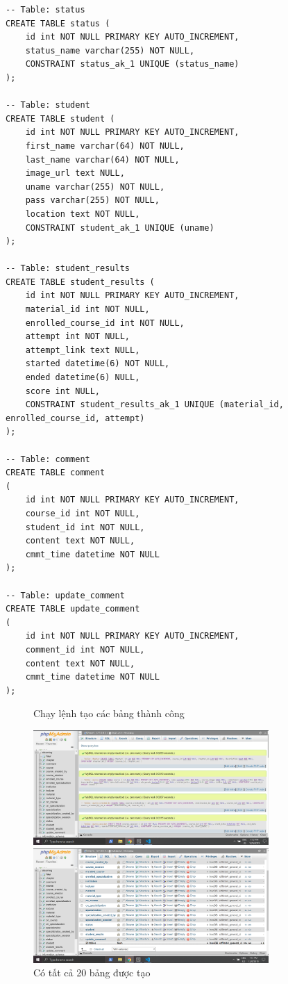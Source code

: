 \documentclass[12pt,a4paper,titlepage]{article}
\begin{document}
\begin{lstlisting}
-- Table: status
CREATE TABLE status (
    id int NOT NULL PRIMARY KEY AUTO_INCREMENT,
    status_name varchar(255) NOT NULL,
    CONSTRAINT status_ak_1 UNIQUE (status_name)
);

-- Table: student
CREATE TABLE student (
    id int NOT NULL PRIMARY KEY AUTO_INCREMENT,
    first_name varchar(64) NOT NULL,
    last_name varchar(64) NOT NULL,
    image_url text NULL,
    uname varchar(255) NOT NULL,
    pass varchar(255) NOT NULL,
    location text NOT NULL,
    CONSTRAINT student_ak_1 UNIQUE (uname)
);

-- Table: student_results
CREATE TABLE student_results (
    id int NOT NULL PRIMARY KEY AUTO_INCREMENT,
    material_id int NOT NULL,
    enrolled_course_id int NOT NULL,
    attempt int NOT NULL,
    attempt_link text NULL,
    started datetime(6) NOT NULL,
    ended datetime(6) NULL,
    score int NULL,
    CONSTRAINT student_results_ak_1 UNIQUE (material_id, enrolled_course_id, attempt)
);

-- Table: comment
CREATE TABLE comment
(
	id int NOT NULL PRIMARY KEY AUTO_INCREMENT,
	course_id int NOT NULL,
	student_id int NOT NULL,
	content text NOT NULL,
    cmmt_time datetime NOT NULL
);

-- Table: update_comment
CREATE TABLE update_comment
(
	id int NOT NULL PRIMARY KEY AUTO_INCREMENT,
	comment_id int NOT NULL,
	content text NOT NULL,
    cmmt_time datetime NOT NULL
);
\end{lstlisting} 
\begin{figure}[h!]
	\centering
	\caption{Chạy lệnh tạo các bảng thành công}
	\includegraphics[width=0.8\textwidth]{images/create1.png}
	\caption{Có tất cả 20 bảng được tạo}
	\includegraphics[width=0.8\textwidth]{images/create2.png}
\end{figure}
\end{document}

